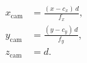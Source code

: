 \begin{align*}
    x_{\text{cam}} &= \frac{(x - c_x)\, d}{f_x},\\
    y_{\text{cam}} &= \frac{(y - c_y)\, d}{f_y},\\
    z_{\text{cam}} &= d.
\end{align*}
